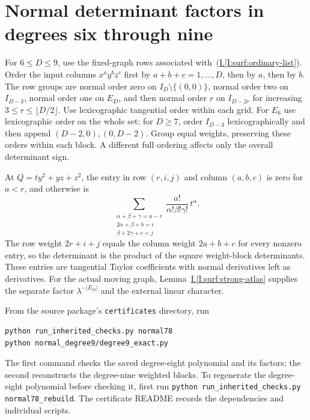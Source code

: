 \documentclass[11pt]{amsart}
\theoremstyle{definition}
\theoremstyle{remark}
\numberwithin{equation}{section}
\newcommand{\partIref}[1]{\hyperref[I:#1]{I.\ref*{I:#1}}}
\newcommand{\partIeqref}[1]{\textup{(\partIref{#1})}}
\begin{document}
\section{Normal determinant factors in degrees six through nine}\label{supp:normal-factors}

For $6\le D\le9$, use the fixed-graph rows associated with~\partIeqref{surf:ordinary-list}. Order the input columns $x^ay^bz^c$ first by $a+b+c=1,\ldots,D$, then by $a$, then by $b$. The row groups are normal order zero on $I_D\setminus\{(0,0)\}$, normal order two on $I_{D-3}$, normal order one on $E_D$, and then normal order $r$ on $I_{D-2r}$ for increasing $3\le r\le\lfloor D/2\rfloor$. Use lexicographic tangential order within each grid. For $E_6$ use lexicographic order on the whole set; for $D\ge7$, order $I_{D-3}$ lexicographically and then append $(D-2,0),(0,D-2)$. Group equal weights, preserving these orders within each block. A different full ordering affects only the overall determinant sign.

At $Q=ty^2+yz+z^2$, the entry in row $(r,i,j)$ and column $(a,b,c)$ is zero for $a<r$, and otherwise is
\begin{equation}\label{supp:normal-matrix-entry}
\sum_{\substack{\alpha+\beta+\gamma=a-r\\2\alpha+\beta+b=i\\\beta+2\gamma+c=j}}\frac{a!}{\alpha!\beta!\gamma!}\,t^\alpha.
\end{equation}
The row weight $2r+i+j$ equals the column weight $2a+b+c$ for every nonzero entry, so the determinant is the product of the square weight-block determinants. These entries are tangential Taylor coefficients with normal derivatives left as derivatives. For the actual moving graph, Lemma~\partIref{surf:strong-atlas} supplies the separate factor $\lambda^{-|E_D|}$ and the external linear character.

From the source package's \texttt{certificates} directory, run
\begin{verbatim}
python run_inherited_checks.py normal78
python normal_degree9/degree9_exact.py
\end{verbatim}
The first command checks the saved degree-eight polynomial and its factors; the second reconstructs the degree-nine weighted blocks. To regenerate the degree-eight polynomial before checking it, first run \texttt{python run\_inherited\_checks.py normal78\_rebuild}. The certificate README records the dependencies and individual scripts.
\end{document}
